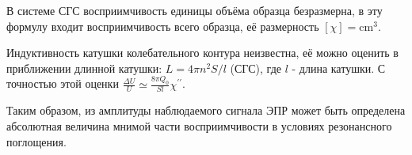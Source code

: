 \documentclass[a4paper, 12pt]{article}%
\begin{document}
	В системе СГС восприимчивость единицы объёма образца безразмерна, в эту формулу входит восприимчивость всего образца, её размерность $[\chi]=\mathrm{cm}^3$.
	
	Индуктивность катушки колебательного контура неизвестна, её можно оценить в приближении длинной катушки: $L=4 \pi n^2 S / l$ (СГС), где $l$ - длина катушки. С точностью этой оценки $\frac{\Delta U}{U} \simeq \frac{8 \pi Q_0}{S l} \chi^{\prime \prime}$.
	
	Таким образом, из амплитуды наблюдаемого сигнала ЭПР может быть определена абсолютная величина мнимой части восприимчивости в условиях резонансного поглощения.
	
	
	
	
	
	
	
	
	
	
\end{document}
